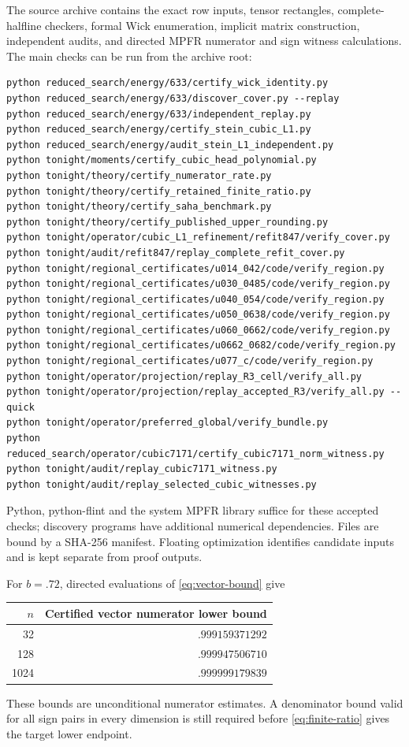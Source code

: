 \documentclass[11pt]{article}
\begin{document}
The source archive contains the exact row inputs, tensor rectangles,
complete-halfline checkers, formal Wick enumeration, implicit matrix
construction, independent audits, and directed MPFR numerator and sign
witness calculations. The main checks can be run from the archive root:
\begin{verbatim}
python reduced_search/energy/633/certify_wick_identity.py
python reduced_search/energy/633/discover_cover.py --replay
python reduced_search/energy/633/independent_replay.py
python reduced_search/energy/certify_stein_cubic_L1.py
python reduced_search/energy/audit_stein_L1_independent.py
python tonight/moments/certify_cubic_head_polynomial.py
python tonight/theory/certify_numerator_rate.py
python tonight/theory/certify_retained_finite_ratio.py
python tonight/theory/certify_saha_benchmark.py
python tonight/theory/certify_published_upper_rounding.py
python tonight/operator/cubic_L1_refinement/refit847/verify_cover.py
python tonight/audit/refit847/replay_complete_refit_cover.py
python tonight/regional_certificates/u014_042/code/verify_region.py
python tonight/regional_certificates/u030_0485/code/verify_region.py
python tonight/regional_certificates/u040_054/code/verify_region.py
python tonight/regional_certificates/u050_0638/code/verify_region.py
python tonight/regional_certificates/u060_0662/code/verify_region.py
python tonight/regional_certificates/u0662_0682/code/verify_region.py
python tonight/regional_certificates/u077_c/code/verify_region.py
python tonight/operator/projection/replay_R3_cell/verify_all.py
python tonight/operator/projection/replay_accepted_R3/verify_all.py --quick
python tonight/operator/preferred_global/verify_bundle.py
python reduced_search/operator/cubic7171/certify_cubic7171_norm_witness.py
python tonight/audit/replay_cubic7171_witness.py
python tonight/audit/replay_selected_cubic_witnesses.py
\end{verbatim}
Python, python-flint and the system MPFR library suffice for these accepted
checks; discovery programs have additional numerical dependencies.
Files are bound by a SHA-256 manifest. Floating optimization identifies
candidate inputs and is kept separate from proof outputs.

For $b=.72$, directed evaluations of \eqref{eq:vector-bound} give
\begin{center}\small
\begin{tabular}{rr}
$n$ & Certified vector numerator lower bound\\\hline
32 & $.999159371292$\\
128 & $.999947506710$\\
1024 & $.999999179839$\\\hline
\end{tabular}
\end{center}
These bounds are unconditional numerator estimates. A denominator bound
valid for all sign pairs in every dimension is still required before
\eqref{eq:finite-ratio} gives the target lower endpoint.
\end{document}
